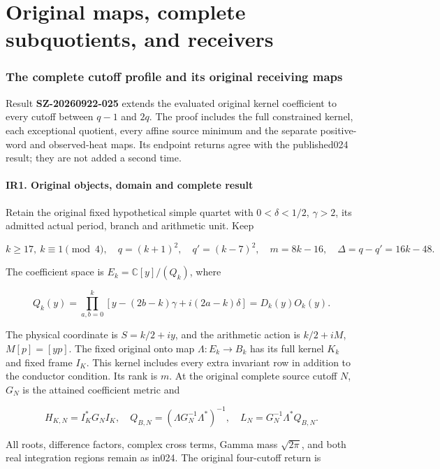 \documentclass[10pt]{article}
\begin{document}
\clearpage\part{Original maps, complete subquotients, and receivers}
\section{The complete cutoff profile and its original receiving maps}\label{the-complete-cutoff-profile-and-its-original-receiving-maps}

Result \textbf{SZ-20260922-025} extends the evaluated original kernel coefficient to every cutoff between \(q-1\) and \(2q\). The proof includes the full constrained kernel, each exceptional quotient, every affine source minimum and the separate positive-word and observed-heat maps. Its endpoint returns agree with the published024 result; they are not added a second time.

\subsection{IR1. Original objects, domain and complete result}\label{ir1.-original-objects-domain-and-complete-result}

Retain the original fixed hypothetical simple quartet with \(0<\delta<1/2\), \(\gamma>2\), its admitted actual period, branch and arithmetic unit. Keep

\[
 k\ge17,\ k\equiv1\pmod4,\quad q=(k+1)^2,\quad q'=(k-7)^2,
 \quad m=8k-16,\quad\Delta=q-q'=16k-48.
 \tag{IR1}
\]

The coefficient space is \(E_k=\mathbb C[y]/(Q_k)\), where

\[
 Q_k(y)=\prod_{a,b=0}^k[y-(2b-k)\gamma+i(2a-k)\delta]=D_k(y)O_k(y).
 \tag{IR2}
\]

The physical coordinate is \(S=k/2+iy\), and the arithmetic action is \(k/2+iM\), \(M[p]=[yp]\). The fixed original onto map \(\Lambda:E_k\to B_k\) has its full kernel \(K_k\) and fixed frame \(I_K\). This kernel includes every extra invariant row in addition to the conductor condition. Its rank is \(m\). At the original complete source cutoff \(N\), \(G_N\) is the attained coefficient metric and

\[
 H_{K,N}=I_K^*G_NI_K,\quad Q_{B,N}=(\Lambda G_N^{-1}\Lambda^*)^{-1},
 \quad L_N=G_N^{-1}\Lambda^*Q_{B,N}.
 \tag{IR3}
\]

All roots, difference factors, complex cross terms, Gamma mass \(\sqrt{2\pi}\), and both real integration regions remain as in024. The original four-cutoff return is
\end{document}
